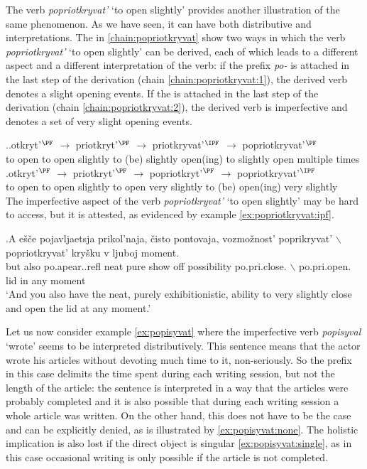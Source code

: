 The verb \textit{popriotkryvat'} `to open slightly' provides another illustration of the same phenomenon. As we have seen, it can have both distributive and  interpretations. The  in \ref{chain:popriotkryvat} show two ways in which the verb \textit{popriotkryvat'} `to open slightly' can be derived, each of which leads to a different aspect and a different interpretation of the verb: if the prefix \textit{po-} is attached in the last step of the derivation (chain \ref{chain:popriotkryvat:1}), the derived verb denotes a  slight opening events. If the  is attached in the last step of the derivation (chain \ref{chain:popriotkryvat:2}), the derived verb is imperfective and denotes a set of very slight opening events. 

\ex.\label{chain:popriotkryvat}\ag.\label{chain:popriotkryvat:1}otkryt'$^{\PF}$ $\rightarrow$ priotkryt'$^{\PF}$ $\rightarrow$ priotkryvat'$^{\IPF}$ $\rightarrow$ popriotkryvat'$^{\PF}$\\
{to open} {} {to open slightly} {} {to (be) slightly open(ing)} {} {to slightly open multiple times}\\
\bg.\label{chain:popriotkryvat:2}otkryt'$^{\PF}$ $\rightarrow$ priotkryt'$^{\PF}$ $\rightarrow$ popriotkryt'$^{\PF}$ $\rightarrow$ popriotkryvat'$^{\IPF}$\\
{to open} {} {to open slightly} {} {to open very slightly} {} {to (be) open(ing) very slightly}\\

The imperfective aspect of the verb \textit{popriotkryvat'} `to open slightly' may be hard to access, but it is attested, as evidenced by example \ref{ex:popriotkryvat:ipf}. 

\exg.\label{ex:popriotkryvat:ipf}A e\v{s}\v{c}e pojavljaetsja prikol'naja, \v{c}isto pontovaja, vozmo\v{z}nost' poprikryvat' {$\backslash$} popriotkryvat' kry\v{s}ku v ljuboj moment.\\
but also po.apear..refl neat pure {show off} possibility po.pri.close. {$\backslash$} po.pri.open. lid in any moment\\
`And you also have the neat, purely exhibitionistic, ability to very slightly close and open the lid at any moment.'

Let us now consider example \ref{ex:popisyvat} where the imperfective verb \textit{popisyval} `wrote' seems to be interpreted distributively. This sentence means that the actor wrote his articles without devoting much time to it, non-seriously. So the prefix in this case delimits the time spent during each writing session, but not the length of the article: the sentence is interpreted in a way that the articles were probably completed and it is also possible that during each writing session a whole article was written. On the other hand, this does not have to be the case and can be explicitly denied, as is illustrated by \ref{ex:popisyvat:none}. The holistic implication is also lost if the direct object is singular \ref{ex:popisyvat:single}, as in this case occasional writing is only possible if the article is not completed. 

